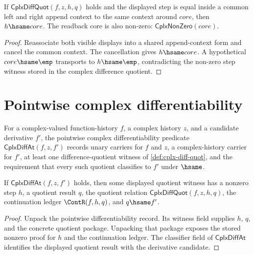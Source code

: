 \begin{theorem}
\label{thm:cplx-diff-quot-step-visible-context-readback}
If $\mathsf{CplxDiffQuot}(f,z,h,q)$ holds and the displayed step is equal
inside a common left and right append context to the same context around
$core$, then $h\hsame core$. The readback core is also non-zero:
\(\mathsf{CplxNonZero}(core)\).
\end{theorem}
\begin{proof}
Reassociate both visible displays into a shared append-context form and cancel
the common context. The cancellation gives $h\hsame core$. A hypothetical
$core\hsame\emp$ transports to $h\hsame\emp$, contradicting the non-zero step
witness stored in the complex difference quotient.
\end{proof}

\section{Pointwise complex differentiability}

\begin{definition}
\label{def:cplx-diff-at}
For a complex-valued function-history \(f\), a complex history \(z\), and a candidate derivative \(f'\), the pointwise complex differentiability predicate \(\mathsf{CplxDiffAt}(f, z, f')\) records unary carriers for \(f\) and \(z\), a complex-history carrier for \(f'\), at least one difference-quotient witness of \autoref{def:cplx-diff-quot}, and the requirement that every such quotient classifies to \(f'\) under \(\hsame\).
\end{definition}

\begin{lemma}
\label{lem:cplx-diff-at-witness-step-nonzero}
If \(\mathsf{CplxDiffAt}(f,z,f')\) holds, then some displayed quotient
witness has a nonzero step \(h\), a quotient result \(q\), the quotient
relation \(\mathsf{CplxDiffQuot}(f,z,h,q)\), the continuation ledger
\(\ContR(f,h,q)\), and \(q\hsame f'\).
\end{lemma}
\begin{proof}
Unpack the pointwise differentiability record. Its witness field supplies
\(h\), \(q\), and the concrete quotient package. Unpacking that package exposes
the stored nonzero proof for \(h\) and the continuation ledger. The classifier
field of \(\mathsf{CplxDiffAt}\) identifies the displayed quotient result with
the derivative candidate.
\end{proof}

